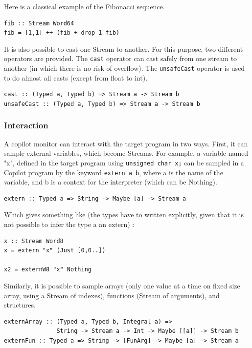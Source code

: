 \documentclass[a4paper,11pt,final]{article}
\begin{document}
	Here is a classical example of the Fibonacci sequence.
	
\begin{verbatim}
fib :: Stream Word64
fib = [1,1] ++ (fib + drop 1 fib)  
\end{verbatim}
	
	It is also possible to cast one Stream to another. For this purpose, two different operators are provided. The \texttt{cast} operator can cast safely from one stream to another (in which there is no risk of overflow). The \texttt{unsafeCast} operator is used to do almost all casts (except from float to int).
\begin{verbatim}
cast :: (Typed a, Typed b) => Stream a -> Stream b
unsafeCast :: (Typed a, Typed b) => Stream a -> Stream b
\end{verbatim}
	
	\subsubsection{Interaction}
	A copilot monitor can interact with the target program in two ways. First, it can sample external variables, which become Streams. For example, a variable named "x", defined in the target program using \texttt{unsigned char x;} can be sampled in a Copilot program by the keyword \texttt{extern a b}, where a is the name of the variable, and b is a context for the interpreter (which can be Nothing).
\begin{verbatim}
extern :: Typed a => String -> Maybe [a] -> Stream a
\end{verbatim}
	
	Which gives something like (the types have to written explicitly, given that it is not possible to infer the type a an extern) :
	
\begin{verbatim}
x :: Stream Word8
x = extern "x" (Just [0,0..])

x2 = externW8 "x" Nothing
\end{verbatim}
	
	Similarly, it is possible to sample arrays (only one value at a time on fixed size array, using a Stream of indexes), functions (Stream of arguments), and structures.
	
	\begin{verbatim}
externArray :: (Typed a, Typed b, Integral a) => 
               String -> Stream a -> Int -> Maybe [[a]] -> Stream b
externFun :: Typed a => String -> [FunArg] -> Maybe [a] -> Stream a
\end{verbatim}
	
\end{document}
